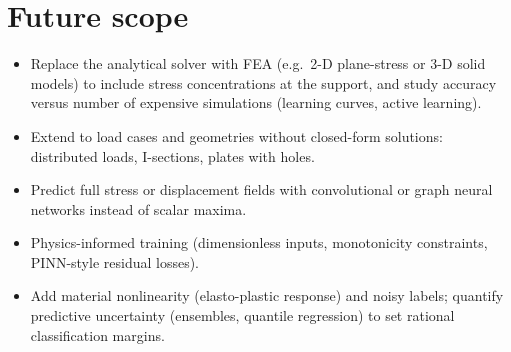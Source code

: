 \documentclass[11pt,a4paper]{article}
\begin{document}
\section{Future scope}
\begin{itemize}
\item Replace the analytical solver with FEA (e.g.\ 2-D plane-stress or 3-D solid models) to include stress concentrations
at the support, and study accuracy versus number of expensive simulations (learning curves, active learning).
\item Extend to load cases and geometries without closed-form solutions: distributed loads, I-sections, plates with holes.
\item Predict full stress or displacement fields with convolutional or graph neural networks instead of scalar maxima.
\item Physics-informed training (dimensionless inputs, monotonicity constraints, PINN-style residual losses).
\item Add material nonlinearity (elasto-plastic response) and noisy labels; quantify predictive uncertainty
(ensembles, quantile regression) to set rational classification margins.
\end{itemize}
\end{document}
